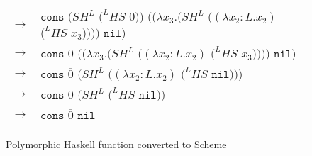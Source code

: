 \begin{figure}[tb]
\begin{tabular}{ll}
\vspace{5pt}

$\rightarrow$ & $\mathtt{cons}$ $(SH^{L}$ $(^{L}HS$ $\overline{0}))$ $((\lambda x_{3}.(SH^{L}$ $((\lambda x_{2}:L.x_{2})$ $(^{L}HS$ $x_{3}))))$ $\mathtt{nil})$ \\

\vspace{5pt}

$\rightarrow$ & $\mathtt{cons}$ $\overline{0}$ $((\lambda x_{3}.(SH^{L}$ $((\lambda x_{2}:L.x_{2})$ $(^{L}HS$ $x_{3}))))$ $\mathtt{nil})$ \\

\vspace{5pt}

$\rightarrow$ & $\mathtt{cons}$ $\overline{0}$ $(SH^{L}$ $((\lambda x_{2}:L.x_{2})$ $(^{L}HS$ $\mathtt{nil})))$ \\

\vspace{5pt}

$\rightarrow$ & $\mathtt{cons}$ $\overline{0}$ $(SH^{L}$ $(^{L}HS$ $\mathtt{nil}))$ \\

\vspace{5pt}

$\rightarrow$ & $\mathtt{cons}$ $\overline{0}$ $\mathtt{nil}$
\end{tabular}
\caption{Polymorphic Haskell function converted to Scheme}
\label{forall-3}
\end{figure}